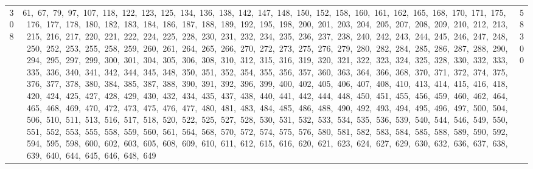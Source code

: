 \begin{longtable}{c|p{}|r}
308 & 61,\ 67,\ 79,\ 97,\ 107,\ 118,\ 122,\ 123,\ 125,\ 134,\ 136,\ 138,\ 142,\ 147,\ 148,\ 150,\ 152,\ 158,\ 160,\ 161,\ 162,\ 165,\ 168,\ 170,\ 171,\ 175,\ 176,\ 177,\ 178,\ 180,\ 182,\ 183,\ 184,\ 186,\ 187,\ 188,\ 189,\ 192,\ 195,\ 198,\ 200,\ 201,\ 203,\ 204,\ 205,\ 207,\ 208,\ 209,\ 210,\ 212,\ 213,\ 215,\ 216,\ 217,\ 220,\ 221,\ 222,\ 224,\ 225,\ 228,\ 230,\ 231,\ 232,\ 234,\ 235,\ 236,\ 237,\ 238,\ 240,\ 242,\ 243,\ 244,\ 245,\ 246,\ 247,\ 248,\ 250,\ 252,\ 253,\ 255,\ 258,\ 259,\ 260,\ 261,\ 264,\ 265,\ 266,\ 270,\ 272,\ 273,\ 275,\ 276,\ 279,\ 280,\ 282,\ 284,\ 285,\ 286,\ 287,\ 288,\ 290,\ 294,\ 295,\ 297,\ 299,\ 300,\ 301,\ 304,\ 305,\ 306,\ 308,\ 310,\ 312,\ 315,\ 316,\ 319,\ 320,\ 321,\ 322,\ 323,\ 324,\ 325,\ 328,\ 330,\ 332,\ 333,\ 335,\ 336,\ 340,\ 341,\ 342,\ 344,\ 345,\ 348,\ 350,\ 351,\ 352,\ 354,\ 355,\ 356,\ 357,\ 360,\ 363,\ 364,\ 366,\ 368,\ 370,\ 371,\ 372,\ 374,\ 375,\ 376,\ 377,\ 378,\ 380,\ 384,\ 385,\ 387,\ 388,\ 390,\ 391,\ 392,\ 396,\ 399,\ 400,\ 402,\ 405,\ 406,\ 407,\ 408,\ 410,\ 413,\ 414,\ 415,\ 416,\ 418,\ 420,\ 424,\ 425,\ 427,\ 428,\ 429,\ 430,\ 432,\ 434,\ 435,\ 437,\ 438,\ 440,\ 441,\ 442,\ 444,\ 448,\ 450,\ 451,\ 455,\ 456,\ 459,\ 460,\ 462,\ 464,\ 465,\ 468,\ 469,\ 470,\ 472,\ 473,\ 475,\ 476,\ 477,\ 480,\ 481,\ 483,\ 484,\ 485,\ 486,\ 488,\ 490,\ 492,\ 493,\ 494,\ 495,\ 496,\ 497,\ 500,\ 504,\ 506,\ 510,\ 511,\ 513,\ 516,\ 517,\ 518,\ 520,\ 522,\ 525,\ 527,\ 528,\ 530,\ 531,\ 532,\ 533,\ 534,\ 535,\ 536,\ 539,\ 540,\ 544,\ 546,\ 549,\ 550,\ 551,\ 552,\ 553,\ 555,\ 558,\ 559,\ 560,\ 561,\ 564,\ 568,\ 570,\ 572,\ 574,\ 575,\ 576,\ 580,\ 581,\ 582,\ 583,\ 584,\ 585,\ 588,\ 589,\ 590,\ 592,\ 594,\ 595,\ 598,\ 600,\ 602,\ 603,\ 605,\ 608,\ 609,\ 610,\ 611,\ 612,\ 615,\ 616,\ 620,\ 621,\ 623,\ 624,\ 627,\ 629,\ 630,\ 632,\ 636,\ 637,\ 638,\ 639,\ 640,\ 644,\ 645,\ 646,\ 648,\ 649 & 58300 \\

\end{longtable}
